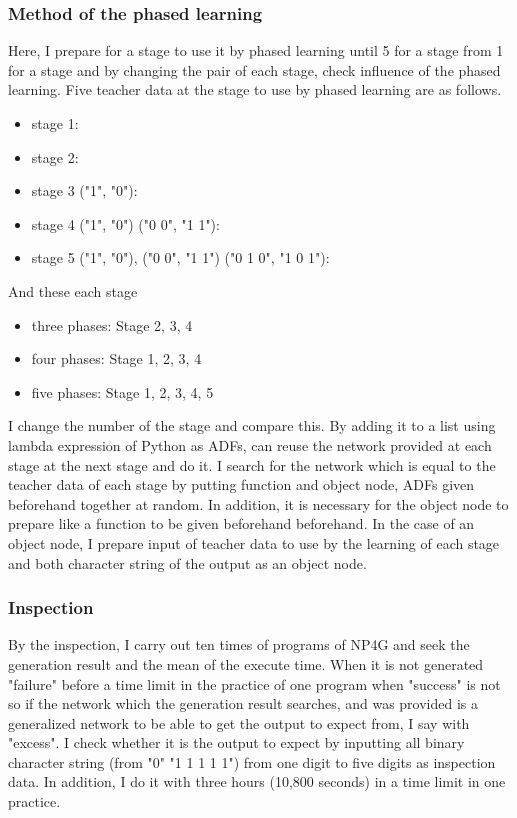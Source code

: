 \documentclass{article}
\begin{document}
\subsubsection {Method of the phased learning}
\label{sec:PLhow}
Here, I prepare for a stage to use it by phased learning until 5 for a stage from 1 for a stage and by changing the pair of each stage, check influence of the phased learning.
Five teacher data at the stage to use by phased learning are as follows.
\begin{itemize}
\item stage 1:
\item stage 2:
\item stage 3 ("1", "0"):
\item stage 4 ("1", "0") ("0 0", "1 1"):
\item stage 5 ("1", "0"), ("0 0", "1 1") ("0 1 0", "1 0 1"):
\end{itemize}
And these each stage
\begin{itemize}
\item three phases:
Stage 2, 3, 4
\item four phases:
Stage 1, 2, 3, 4
\item five phases:
Stage 1, 2, 3, 4, 5
\end{itemize}
\noindent
I change the number of the stage and compare this.
By adding it to a list using lambda expression of Python as ADFs, can reuse the network provided at each stage at the next stage and do it.
I search for the network which is equal to the teacher data of each stage by putting function and object node, ADFs given beforehand together at random.
In addition, it is necessary for the object node to prepare like a function to be given beforehand beforehand.
In the case of an object node, I prepare input of teacher data to use by the learning of each stage and both character string of the output as an object node.
\subsubsection {Inspection}
By the inspection, I carry out ten times of programs of NP4G and seek the generation result and the mean of the execute time.
When it is not generated "failure" before a time limit in the practice of one program when "success" is not so if the network which the generation result searches, and was provided is a generalized network to be able to get the output to expect from, I say with "excess".
I check whether it is the output to expect by inputting all binary character string (from "0" "1 1 1 1 1") from one digit to five digits as inspection data.
In addition, I do it with three hours (10,800 seconds) in a time limit in one practice.
\end{document}
